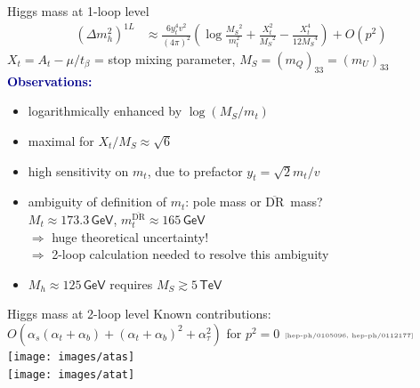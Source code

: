 \documentclass[hyperref={pdfpagelabels=false},ngerman]{beamer}
\newcommand{\eh}[1]{\,\mathsf{#1}}
\newcommand{\MS}{\ensuremath{M_S}}
\newcommand{\mycite}[1]{\ensuremath{\text{\textcolor{darkgray}{\tiny [#1]}}}}
\renewcommand{\emph}[1]{\textbf{\textcolor{darkblue}{#1}}}
\newcommand{\DRbar}{\ensuremath{\overline{\text{DR}}}}
\newcommand{\at}{\alpha_t}
\newcommand{\ab}{\alpha_b}
\newcommand{\atau}{\alpha_\tau}
\newcommand{\as}{\alpha_s}
\newcommand{\GeV}{\eh{GeV}}
\begin{document}

\begin{frame}{Higgs mass at 1-loop level}
  \begin{align*}
    (\Delta m_h^2)^{1L} &\approx
    \frac{6 y_t^4 v^2}{(4\pi)^2} \left(
      \log\frac{\MS^2}{m_t^2}
      + \frac{X_t^2}{\MS^2}
      - \frac{X_t^4}{12 \MS^4}
    \right) + O(p^2)
  \end{align*}
  $X_t = A_t - \mu/t_\beta$ = stop mixing parameter,
  $\MS = (m_Q)_{33} = (m_U)_{33}$
  \\[1em]
  \emph{Observations:}
  \begin{itemize}
  \item logarithmically enhanced by $\log(\MS / m_t)$
  \item maximal for $X_t/\MS \approx \sqrt{6}$
  \item high sensitivity on $m_t$, due to prefactor $y_t = \sqrt{2} m_t/v$
  \item ambiguity of definition of $m_t$: pole mass or \DRbar\ mass? \\
    $M_t \approx 173.3\GeV$, $m_t^{\DRbar} \approx 165\GeV$ \\
    $\Rightarrow$ huge theoretical uncertainty!\\
    $\Rightarrow$ 2-loop calculation needed to resolve this ambiguity
  \item $M_h \approx 125\GeV$ requires $\MS \gtrsim 5\eh{TeV}$
  \end{itemize}
\end{frame}


\begin{frame}{Higgs mass at 2-loop level}
  Known contributions: $O(\as (\at + \ab) + (\at+\ab)^2 + \atau^2)$
  for $p^2 = 0$ \mycite{hep-ph/0105096, hep-ph/0112177}
  \\[1em]
  \texttt{[image: images/atas]}\\[1em]
  \texttt{[image: images/atat]}
\end{frame}

\end{document}
